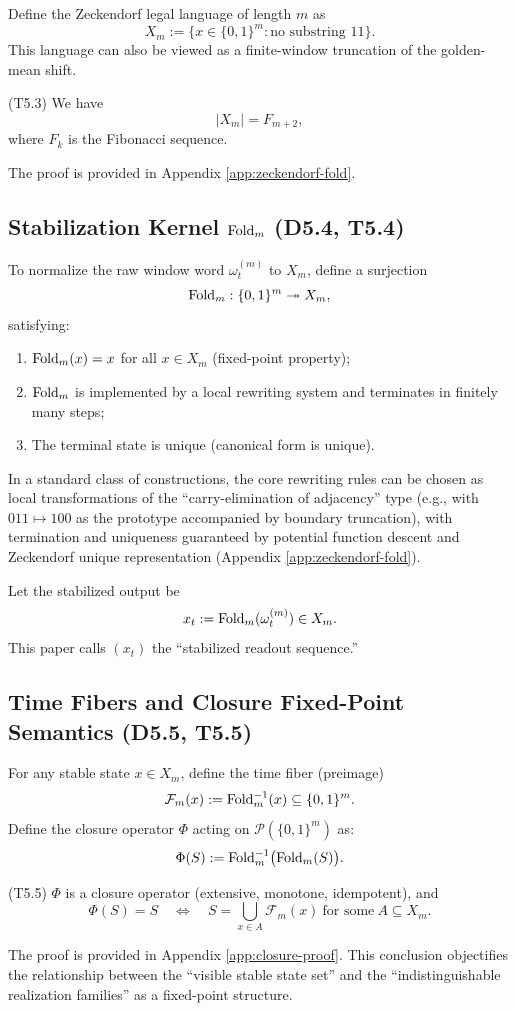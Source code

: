 Define the Zeckendorf legal language of length $m$ as
\[
X_m:=\{x\in\{0,1\}^{m}:\text{no substring }11\}.
\]
This language can also be viewed as a finite-window truncation of the golden-mean shift.

\begin{proposition}[Counting]\label{prop:zeckendorf-count}
(T5.3) We have
\[
|X_m|=F_{m+2},
\]
where $F_k$ is the Fibonacci sequence.
\end{proposition}
The proof is provided in Appendix \ref{app:zeckendorf-fold}.

\subsection{Stabilization Kernel \texorpdfstring{$\mathrm{Fold}_m$}{Fold\_m} (D5.4, T5.4)}

To normalize the raw window word $\omega^{(m)}_t$ to $X_m$, define a surjection
\[
\mathrm{Fold}_m:\{0,1\}^{m}\twoheadrightarrow X_m,
\]
satisfying:
\begin{enumerate}
  \item $\mathrm{Fold}_m(x)=x$ for all $x\in X_m$ (fixed-point property);
  \item $\mathrm{Fold}_m$ is implemented by a local rewriting system and terminates in finitely many steps;
  \item The terminal state is unique (canonical form is unique).
\end{enumerate}
In a standard class of constructions, the core rewriting rules can be chosen as local transformations of the ``carry-elimination of adjacency'' type (e.g., with $011\mapsto 100$ as the prototype accompanied by boundary truncation), with termination and uniqueness guaranteed by potential function descent and Zeckendorf unique representation (Appendix \ref{app:zeckendorf-fold}).

Let the stabilized output be
\[
x_t:=\mathrm{Fold}_m(\omega^{(m)}_t)\in X_m.
\]
This paper calls $(x_t)$ the ``stabilized readout sequence.''

\subsection{Time Fibers and Closure Fixed-Point Semantics (D5.5, T5.5)}

For any stable state $x\in X_m$, define the time fiber (preimage)
\[
\mathcal{F}_m(x):=\mathrm{Fold}_m^{-1}(x)\subseteq\{0,1\}^{m}.
\]
Define the closure operator $\Phi$ acting on $\mathcal{P}(\{0,1\}^{m})$ as:
\[
\Phi(S):=\mathrm{Fold}_m^{-1}\big(\mathrm{Fold}_m(S)\big).
\]

\begin{theorem}\label{thm:closure-fixed-points}
(T5.5) $\Phi$ is a closure operator (extensive, monotone, idempotent), and
\[
\Phi(S)=S\quad \Longleftrightarrow\quad
S=\bigcup_{x\in A}\mathcal{F}_m(x)\ \text{for some}\ A\subseteq X_m.
\]
\end{theorem}
The proof is provided in Appendix \ref{app:closure-proof}. This conclusion objectifies the relationship between the ``visible stable state set'' and the ``indistinguishable realization families'' as a fixed-point structure.
